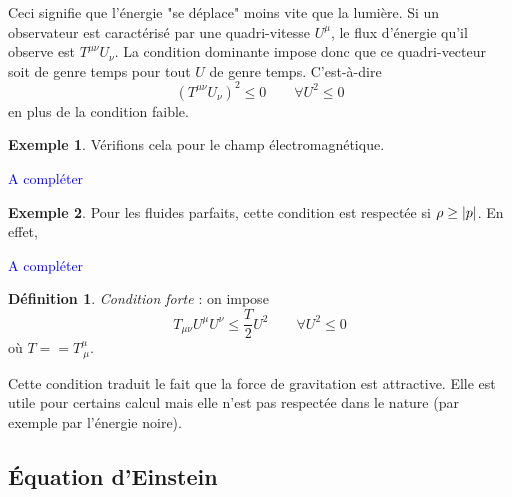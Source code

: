 \documentclass[a4paper,11pt]{report}
\theoremstyle{definition}
\theoremstyle{plain}
\theoremstyle{definition}
\newtheorem{defn}{Définition}[chapter]
\newtheorem{exmp}{Exemple}[chapter]
\theoremstyle{remark}
\newcommand{\comp}{\begin{center}\textcolor{blue}{A compléter}\end{center}}
\begin{document}
            Ceci signifie que l'énergie "se déplace" moins vite que la lumière. Si un observateur est caractérisé par une quadri-vitesse $U^\mu$, le flux d'énergie qu'il observe est $T^{\mu\nu}U_\nu$. La condition dominante impose donc que ce quadri-vecteur soit de genre temps pour tout $U$ de genre temps. C'est-à-dire
            \begin{equation}
                (T^{\mu\nu}U_\nu)^2\leq0 \qquad\forall U^2\leq0
            \end{equation}
            en plus de la condition faible.
            
            \begin{exmp}
                Vérifions cela pour le champ électromagnétique.
                \comp
            \end{exmp}
            
            \begin{exmp}
                Pour les fluides parfaits, cette condition est respectée si $\rho\geq\abs{p}$. En effet,
                \comp
            \end{exmp}
            
            \begin{defn}
                \textit{Condition forte} : on impose
                \begin{equation}
                    T_{\mu\nu}U^\mu U^\nu \leq \frac{T}{2} U^2\qquad \forall U^2\leq0
                \end{equation}
                où $T = = T^\mu_{~\mu}$.
            \end{defn}
        
            Cette condition traduit le fait que la force de gravitation est attractive. Elle est utile pour certains calcul mais elle n'est pas respectée dans le nature (par exemple par l'énergie noire).

        \subsection{Équation d'Einstein}
        
\end{document}
